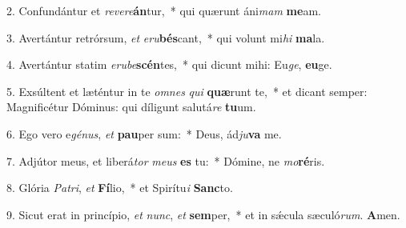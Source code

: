 2. Confundántur et \textit{re}\textit{ve}\textit{re}\textbf{án}tur,~*  qui quærunt áni\textit{mam} \textbf{me}am.\

3. Avertántur retrórsum, \textit{et} \textit{e}\textit{ru}\textbf{bés}cant,~*  qui volunt mi\textit{hi} \textbf{ma}la.\

4. Avertántur statim \textit{e}\textit{ru}\textit{be}\textbf{scén}tes,~*  qui dicunt mihi: Eu\textit{ge}, \textbf{eu}ge.\

5. Exsúltent et læténtur in te \textit{om}\textit{nes} \textit{qui} \textbf{quæ}runt te,~*  et dicant semper: Magnificétur Dóminus: qui díligunt salutá\textit{re} \textbf{tu}um.\

6. Ego vero e\textit{gé}\textit{nus}, \textit{et} \textbf{pau}per sum:~*  Deus, ád\textit{ju}\textbf{va} me.\

7. Adjútor meus, et liberá\textit{tor} \textit{me}\textit{us} \textbf{es} tu:~*  Dómine, ne \textit{mo}\textbf{ré}ris.\

8. Glória \textit{Pa}\textit{tri}, \textit{et} \textbf{Fí}lio,~*  et Spirítu\textit{i} \textbf{Sanc}to.\

9. Sicut erat in princípio, \textit{et} \textit{nunc}, \textit{et} \textbf{sem}per,~*  et in sǽcula sæculó\textit{rum}. \textbf{A}men.\

